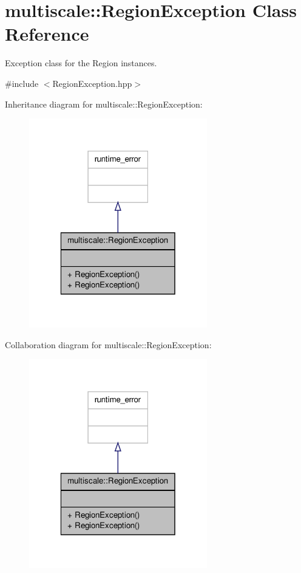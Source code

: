 \hypertarget{classmultiscale_1_1RegionException}{\section{multiscale\-:\-:Region\-Exception Class Reference}
\label{classmultiscale_1_1RegionException}
}


Exception class for the Region instances.  




{\ttfamily \#include $<$Region\-Exception.\-hpp$>$}



Inheritance diagram for multiscale\-:\-:Region\-Exception\-:\nopagebreak
\begin{figure}[H]
\begin{center}
\leavevmode
\includegraphics[width=220pt]{classmultiscale_1_1RegionException__inherit__graph}
\end{center}
\end{figure}


Collaboration diagram for multiscale\-:\-:Region\-Exception\-:\nopagebreak
\begin{figure}[H]
\begin{center}
\leavevmode
\includegraphics[width=220pt]{classmultiscale_1_1RegionException__coll__graph}
\end{center}
\end{figure}
